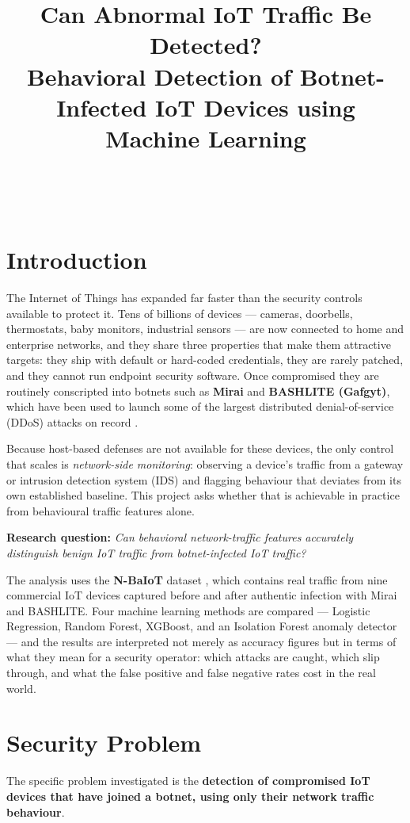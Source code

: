 \documentclass[11pt]{article}
\title{\textbf{Can Abnormal IoT Traffic Be Detected?}\\[4pt]
\large Behavioral Detection of Botnet-Infected IoT Devices using Machine Learning}
\author{\fillin{Your Name}\\ \fillin{Course Name / Number}\\ \fillin{Instructor}}
\date{\fillin{Date}}
\begin{document}
\maketitle

\section{Introduction}
The Internet of Things has expanded far faster than the security controls
available to protect it. Tens of billions of devices --- cameras, doorbells,
thermostats, baby monitors, industrial sensors --- are now connected to home
and enterprise networks, and they share three properties that make them
attractive targets: they ship with default or hard-coded credentials, they are
rarely patched, and they cannot run endpoint security software. Once
compromised they are routinely conscripted into botnets such as \textbf{Mirai}
and \textbf{BASHLITE (Gafgyt)}, which have been used to launch some of the
largest distributed denial-of-service (DDoS) attacks on record
\cite{kolias2017ddos}.

Because host-based defenses are not available for these devices, the only
control that scales is \emph{network-side monitoring}: observing a device's
traffic from a gateway or intrusion detection system (IDS) and flagging
behaviour that deviates from its own established baseline. This project asks
whether that is achievable in practice from behavioural traffic features
alone.

\medskip
\noindent\textbf{Research question:}
\emph{Can behavioral network-traffic features accurately distinguish benign
IoT traffic from botnet-infected IoT traffic?}

The analysis uses the \textbf{N-BaIoT} dataset \cite{kashif2020nbaiot},
which contains real traffic from nine commercial IoT devices captured before
and after authentic infection with Mirai and BASHLITE. Four machine learning
methods are compared --- Logistic Regression, Random Forest, XGBoost, and an
Isolation Forest anomaly detector --- and the results are interpreted not
merely as accuracy figures but in terms of what they mean for a security
operator: which attacks are caught, which slip through, and what the false
positive and false negative rates cost in the real world.

\section{Security Problem}
The specific problem investigated is the \textbf{detection of compromised IoT
devices that have joined a botnet, using only their network traffic
behaviour}.
\end{document}
